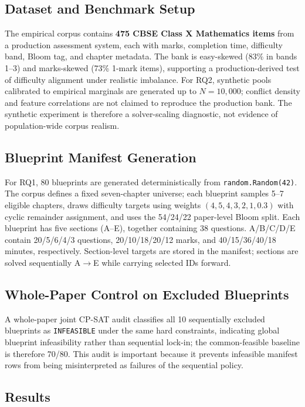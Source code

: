 \documentclass[runningheads]{llncs}
\begin{document}
\subsection{Dataset and Benchmark Setup}
The empirical corpus contains \textbf{475 CBSE Class X Mathematics items} from a production assessment system, each with marks, completion time, difficulty band, Bloom tag, and chapter metadata. The bank is easy-skewed (83\% in bands 1--3) and marks-skewed (73\% 1-mark items), supporting a production-derived test of difficulty alignment under realistic imbalance. For RQ2, synthetic pools calibrated to empirical marginals are generated up to $N{=}10{,}000$; conflict density and feature correlations are not claimed to reproduce the production bank. The synthetic experiment is therefore a solver-scaling diagnostic, not evidence of population-wide corpus realism.
\subsection{Blueprint Manifest Generation}
For RQ1, 80 blueprints are generated deterministically from \texttt{random.Random(42)}. The corpus defines a fixed seven-chapter universe; each blueprint samples 5--7 eligible chapters, draws difficulty targets using weights $(4,5,4,3,2,1,0.3)$ with cyclic remainder assignment, and uses the 54/24/22 paper-level Bloom split.
Each blueprint has five sections (A--E), together containing 38 questions. A/B/C/D/E contain 20/5/6/4/3 questions, 20/10/18/20/12 marks, and 40/15/36/40/18 minutes, respectively. Section-level targets are stored in the manifest; sections are solved sequentially A$\to$E while carrying selected IDs forward.
\subsection{Whole-Paper Control on Excluded Blueprints}
A whole-paper joint CP-SAT audit classifies all 10 sequentially excluded blueprints as \texttt{INFEASIBLE} under the same hard constraints, indicating global blueprint infeasibility rather than sequential lock-in; the common-feasible baseline is therefore 70/80. This audit is important because it prevents infeasible manifest rows from being misinterpreted as failures of the sequential policy.
\subsection{Results}
\end{document}
